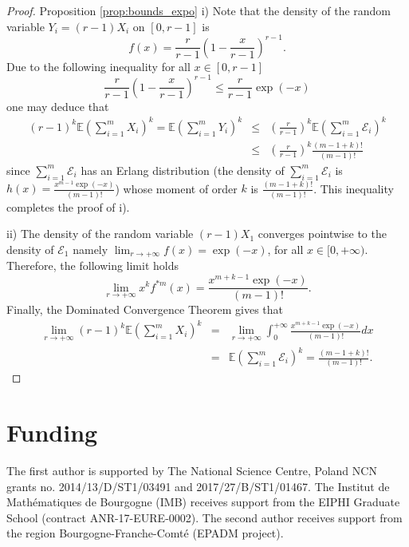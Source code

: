 \documentclass{article}
\theoremstyle{plain}
\newcommand{\E}{{\mathbb E}}
\begin{document}
\begin{proof}{Proposition {\ref{prop:bounds_expo}}}
i) Note that the density of the random variable $Y_i=(r-1)X_i$  on $[0,r-1]$ is
\[ f(x) =\frac{r}{r-1}\left(1-\frac{x}{r-1}\right)^{r-1}.\]
Due to the following inequality for all $x\in [0,r-1]$ 
\[
\frac{r}{r-1}\left(1-\frac{x}{r-1}\right)^{r-1} \le \frac{r}{r-1}\exp(-x)
\]
one may deduce that 
\begin{eqnarray*} (r-1)^k\E\left(\sum_{i=1}^m X_i  \right)^k = \E\left(\sum_{i=1}^m Y_i  \right)^k &\le& \left(\frac{r}{r-1}\right)^k \E\left(\sum_{i=1}^m \mathcal{E}_i\right)^k\\
&\le& \left(\frac{r}{r-1}\right)^k \frac{(m-1+k)!}{(m-1)!}
\end{eqnarray*}since $\sum_{i=1}^m \mathcal{E}_i$ has an Erlang distribution  (the density of $\sum_{i=1}^m \mathcal{E}_i$ is  \\
$h(x)=\frac{x^{m-1}\exp(-x)}{(m-1)!}$) whose  moment of order $k$ is $\frac{(m-1+k)!}{(m-1)!}$. This inequality completes the proof of i).

ii) The density of the random variable $(r-1)X_1$ converges pointwise to the density  of $\mathcal{E}_1$ namely $\lim_{r\to +\infty}f(x)=\exp(-x)$, for all $x\in [0,+\infty)$. Therefore, the following limit holds
\[ 
  \lim_{r\to +\infty}x^kf^{*m}(x)=
  \frac{x^{m+k-1}\exp(-x)}{(m-1)!}.
\]
Finally, the Dominated Convergence Theorem gives that
\begin{eqnarray*}
\lim_{r\to +\infty}
(r-1)^k\E\left(\sum_{i=1}^m X_i\right)^k &=&
\lim_{r\to +\infty} \int_{0}^{+\infty} \frac{x^{m+k-1}\exp(-x)}{(m-1)!}dx\\
&=&  \E\left(\sum_{i=1}^m \mathcal{E}_i\right)^k=\frac{(m-1+k)!}{(m-1)!}.
\end{eqnarray*}
\end{proof}

\section*{Funding}
The first author is supported by The National Science Centre, Poland NCN grants no.  2014/13/D/ST1/03491 and 2017/27/B/ST1/01467.
The Institut de Mathématiques de Bourgogne (IMB) receives support from the EIPHI Graduate School (contract ANR-17-EURE-0002). The second author 
receives support from the region Bourgogne-Franche-Comté (EPADM project). 
\end{document}
